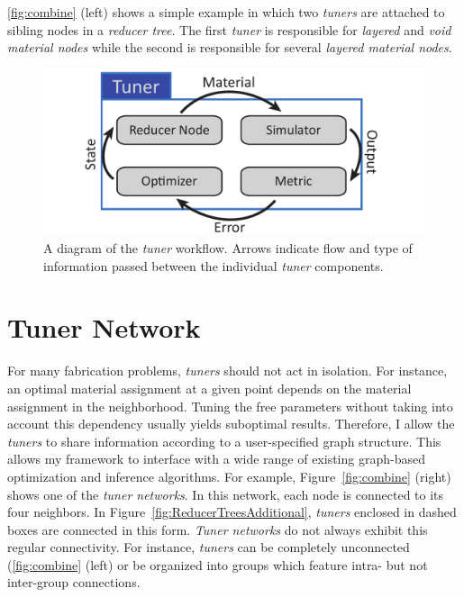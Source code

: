 \autoref{fig:combine} (left) shows a simple example in which two \emph{tuners} are attached to sibling nodes in a \emph{reducer tree}. The first \emph{tuner} is responsible for \emph{layered} and \emph{void material nodes }while the second is responsible for several \emph{layered material nodes}.  

\begin{figure}[h]
\centering
\includegraphics[width=0.7\linewidth]{figure/tuner2.pdf}
\caption{A diagram of the \emph{tuner} workflow. Arrows indicate flow and type of information passed between the individual \emph{tuner} components.}
\label{fig:tuner0}
\end{figure}

\section{Tuner Network}
\label{sec:TunerNetwork}
For many fabrication problems, \emph{tuners} should not act in isolation. For instance, an optimal material assignment at a given point depends on the material assignment in the neighborhood. Tuning the free parameters without taking into account this dependency usually yields suboptimal results. Therefore, I allow the \emph{tuners} to share information according to a user-specified graph structure. This allows my framework to interface with a wide range of existing graph-based optimization and inference algorithms. For example, Figure~\ref{fig:combine} (right) shows one of the \emph{tuner networks}.
In this network, each node is connected to its four neighbors. In Figure~\ref{fig:ReducerTreesAdditional}, \emph{tuners} enclosed in dashed boxes are connected in this form. \emph{Tuner networks} do not always exhibit this regular connectivity. For instance, \emph{tuners} can be completely unconnected (\autoref{fig:combine} (left) or be organized into groups which feature intra- but not inter-group connections.

